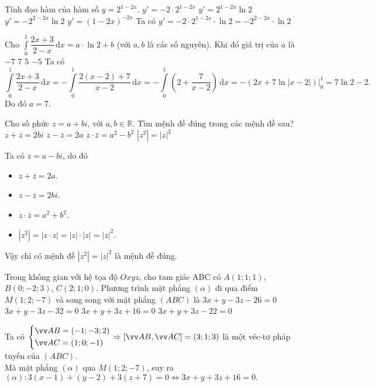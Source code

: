 \begin{ex}%
	Tính đạo hàm của hàm số $y=2^{1-2x}$.
		\choice
	{$y'=-2\cdot 2^{1-2x}$}
	{$y'=2^{1-2x} \ln2$}
	{\True $y'= -2^{2-2x} \ln 2$}
	{$y'=(1-2x)^{-2x}$}
	\loigiai
	{ Ta có $y'=-2\cdot 2^{1-2x}\cdot \ln 2 =-2^{2-2x} \cdot \ln 2$
	}
\end{ex}

\begin{ex}%
	Cho   $\displaystyle\int\limits_0^1 \dfrac{2x+3}{2-x}\mathrm{\,d}x =a\cdot \ln2+b$ (với $a,b$ là các số nguyên). Khi đó giá trị của $a$ là
		\choice
	{$-7$}
	{\True $7$}
	{$5$}
	{$-5$}
	\loigiai
	{ Ta có $$\displaystyle\int\limits_0^1 \dfrac{2x+3}{2-x}\mathrm{\,d}x=- \displaystyle\int\limits_0^1 \dfrac{2(x-2)+7}{x-2}\mathrm{\,d}x=-\displaystyle\int\limits_0^1 \left( 2+\dfrac{7}{x-2}\right)\mathrm{\,d}x =-\left(2x+7\ln|x-2|\right)\bigg|_0^1=7\ln2 -2.$$ Do đó $a=7$.
	}
\end{ex}

\begin{ex}%
	Cho số phức $z=a+bi$, với $a,b \in \mathbb{R}$. Tìm mệnh đề đúng trong các mệnh đề sau?
		\choice
	{$z+\overline{z}=2bi$}
	{$z-\overline{z}=2a$}
	{$z\cdot \overline{z}=a^2-b^2$}
	{\True $|z^2|=|z|^2$}
	\loigiai
	{ Ta có $\overline{z}=a-bi$, do đó 
		\begin{itemize}
			\item $z+\overline{z} =2a$.
			\item $z-\overline{z}=2bi$.
			\item $z\cdot \overline{z}=a^2+b^2$.
			\item $|z^2|=|z\cdot z|=|z|\cdot |z|=|z|^2$.
		\end{itemize}
		Vậy chỉ có mệnh đề $|z^2|=|z|^2$ là mệnh đề đúng.
	}
\end{ex}

\begin{ex}%
	Trong không gian với hệ tọa độ $Oxyz$, cho tam giác ABC có $A(1;1;1)$, $B(0;-2;3)$, $C(2;1;0)$. Phương trình mặt phẳng $(\alpha)$ đi qua điểm $M(1;2;-7)$ và song song với mặt phẳng $(ABC)$ là
		\choice
	{$3x+y-3z-26=0$}
	{$3x+y-3z-32=0$}
	{\True $3x+y+3z+16=0$}
	{$3x+y+3z-22=0$}
	\loigiai
	{ Ta có $\heva {& \vec{AB}=(-1;-3;2)\\&\vec{AC}=(1;0;-1)} \Rightarrow \left[ \vec{AB}, \vec{AC}\right]=(3;1;3)$ là một véc-tơ pháp tuyến của $(ABC)$.\\
		Mà mặt phẳng $(\alpha)$ qua $M(1;2;-7)$, suy ra $(\alpha)\colon 3(x-1)+(y-2)+3(z+7)=0 \Leftrightarrow 3x+y+3z+16=0.$
		
	}
\end{ex}

